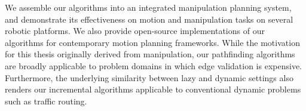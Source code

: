 \begin{fullwidth}
\begin{adjustwidth}{1in}{1in}
We assemble our algorithms into an integrated manipulation planning
system,
and demonstrate its effectiveness on motion and manipulation tasks
on several robotic platforms.
We also provide open-source implementations of our algorithms
for contemporary motion planning frameworks.
While the motivation for this thesis originally derived
from manipulation,
our pathfinding algorithms are broadly applicable to problem domains
in which edge validation is expensive.
Furthermore,
the underlying similarity between lazy and dynamic settings
also renders our incremental algorithms applicable
to conventional dynamic problems such as traffic routing.

\end{adjustwidth}
\end{fullwidth}
